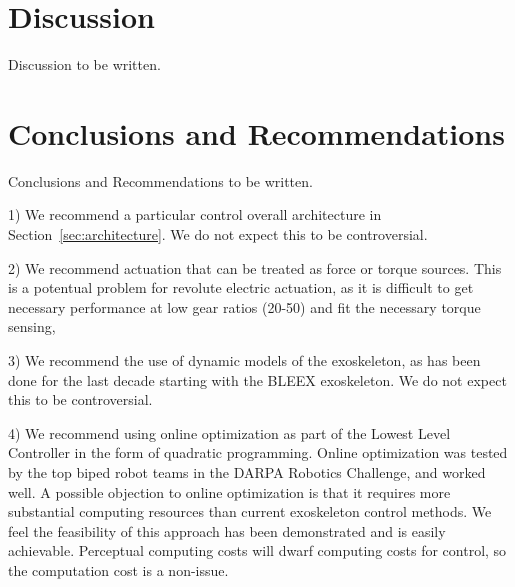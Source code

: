 \documentclass[letterpaper,12pt,fullpage]{article}
\begin{document}
\section{Discussion}

Discussion to be written.

\section{Conclusions and Recommendations}

Conclusions and Recommendations to be written.

1) We recommend a particular control 
overall architecture in Section~\ref{sec:architecture}.
We do not expect this to be controversial.

2) We recommend actuation that can be treated as force or torque sources.
This is a potentual problem for revolute electric actuation, as it
is difficult to get necessary performance at low gear ratios (20-50)
and fit the necessary torque sensing,

3) We recommend the use of dynamic models of the exoskeleton, as has been done
for the last decade starting with the BLEEX exoskeleton.
We do not expect this to be controversial.

4) We recommend using online optimization as part of the Lowest Level Controller
in the form of quadratic programming. Online optimization
was tested by the top biped robot
teams in the DARPA Robotics Challenge, and worked well.
A possible objection to online optimization
is that it requires more substantial computing
resources than current exoskeleton control methods. We feel the feasibility
of this approach has been demonstrated and is easily achievable. Perceptual
computing costs will dwarf computing costs for control, 
so the computation cost is a non-issue.
\end{document}
